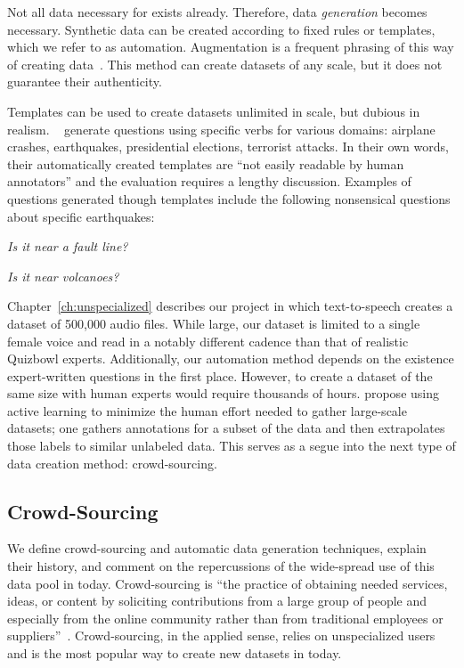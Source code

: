 Not all data necessary for \nlp{} exists already.  
%
Therefore, data \textit{generation} becomes necessary.
%
Synthetic data can be created according to fixed rules or templates, which we refer to as automation. 
%
Augmentation is a frequent phrasing of this way of creating data~\citep{kafle2017data}.
%
This method can create datasets of any scale, but it does not guarantee their authenticity.
%

Templates can be used to create datasets unlimited in scale, but dubious in realism.
%
~\citet{filatova2006automatic} generate questions using specific verbs for various domains: airplane crashes, earthquakes, presidential elections, terrorist attacks.
%
In their own words, their automatically created templates are  ``not  easily  readable  by  human annotators'' and the evaluation requires a lengthy discussion.
%
Examples of questions generated though templates include the following nonsensical questions about specific earthquakes:
\begin{itemize*}
	\item \textit{Is it near a fault line?}
	\item \textit{Is it near volcanoes?}
\end{itemize*}

Chapter~\ref{ch:unspecialized} describes our project in which text-to-speech creates a dataset of 500,000 audio files.  
%
While large, our dataset is limited to a single female voice and read in a notably different cadence than that of realistic Quizbowl experts.  
%
Additionally, our automation method depends on the existence expert-written questions in the first place.  
%
However, to create a dataset of the same size with human experts would require thousands of hours.
%
\citet{Mozafari2014ScalingUC} propose using active learning to minimize the human effort needed to gather large-scale datasets; one gathers annotations for a subset of the data and then extrapolates those labels to similar unlabeled data.  
%
This serves as a segue into the next type of data creation method: crowd-sourcing.  


\subsection{Crowd-Sourcing}
\label{sec:crowd}

We define crowd-sourcing and automatic data generation techniques, explain their history, and comment on the repercussions of the wide-spread use of this data pool in \nlp{} today. 
%
Crowd-sourcing is ``the practice of obtaining needed services, ideas, or content by soliciting contributions from a large group of people and especially from the online community rather than from traditional employees or suppliers''~\citep{mw:crowd}.
%
Crowd-sourcing, in the applied sense, relies on unspecialized users and is the most popular way to create new datasets in \nlp{} today.  
%



